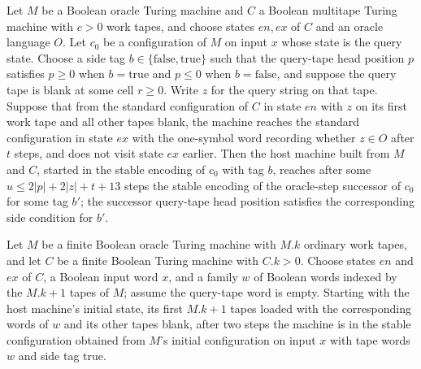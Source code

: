 \begin{theorem}
\label{Turing.oracleHost_query}
\leanok
{}
Let $M$ be a Boolean oracle Turing machine and $C$ a Boolean multitape Turing machine
with $c>0$ work tapes, and choose states $en,ex$ of $C$ and an oracle language $O$. Let
$c_0$ be a configuration of $M$ on input $x$ whose state is the query state. Choose a
side tag $b\in\{\mathrm{false},\mathrm{true}\}$ such that the query-tape head position
$p$ satisfies $p\ge 0$ when $b=\mathrm{true}$ and $p\le 0$ when $b=\mathrm{false}$, and
suppose the query tape is blank at some cell $r\ge0$. Write $z$ for the query string on
that tape. Suppose that from the standard configuration of $C$ in state $en$ with $z$ on
its first work tape and all other tapes blank, the machine reaches the standard
configuration in state $ex$ with the one-symbol word recording whether $z\in O$ after
$t$ steps, and does not visit state $ex$ earlier. Then the host machine built from $M$
and $C$, started in the stable encoding of $c_0$ with tag $b$, reaches after some $u\le
2|p|+2|z|+t+13$ steps the stable encoding of the oracle-step successor of $c_0$ for some
tag $b'$; the successor query-tape head position satisfies the corresponding side
condition for $b'$.
\end{theorem}

\begin{theorem}
\label{Turing.oracleHost_initial}
\leanok
{}
Let $M$ be a finite Boolean oracle Turing machine with $M.k$ ordinary work tapes, and
let $C$ be a finite Boolean Turing machine with $C.k>0$. Choose states $en$ and $ex$ of
$C$, a Boolean input word $x$, and a family $w$ of Boolean words indexed by the $M.k+1$
tapes of $M$; assume the query-tape word is empty. Starting with the host machine's
initial state, its first $M.k+1$ tapes loaded with the corresponding words of $w$ and
its other tapes blank, after two steps the machine is in the stable configuration
obtained from $M$'s initial configuration on input $x$ with tape words $w$ and side tag
true.
\end{theorem}

